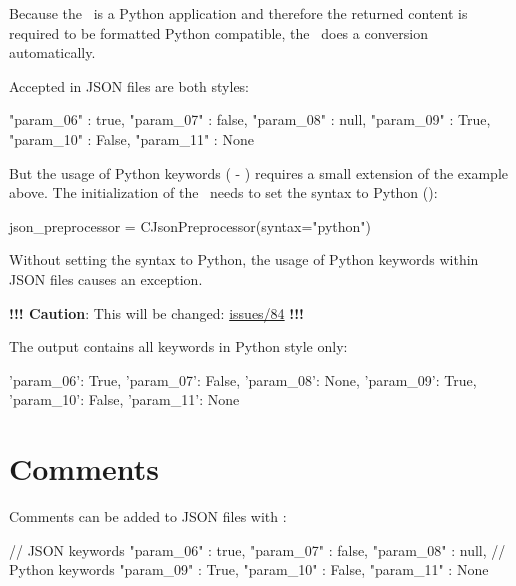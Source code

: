 Because the \pkg\ is a Python application and therefore the returned content is required to be formatted Python compatible,
the \pkg\ does a conversion automatically.

Accepted in JSON files are both styles:

\begin{pythoncode}
{
   "param_06" : true,
   "param_07" : false,
   "param_08" : null,
   "param_09" : True,
   "param_10" : False,
   "param_11" : None
}
\end{pythoncode}

But the usage of Python keywords ( - ) requires a small extension of the example above.
The initialization of the \pkg\ needs to set the syntax to Python ():

\begin{pythoncode}
json_preprocessor = CJsonPreprocessor(syntax="python")
\end{pythoncode}

Without setting the syntax to Python, the usage of Python keywords within JSON files causes an exception.

\textbf{!!! Caution}: This will be changed:
\href{https://github.com/test-fullautomation/python-jsonpreprocessor/issues/84}{issues/84} \textbf{!!!}

The output contains all keywords in Python style only:

\begin{pythonlog}
{'param_06': True,
 'param_07': False,
 'param_08': None,
 'param_09': True,
 'param_10': False,
 'param_11': None}
\end{pythonlog}


\newpage

\section{Comments}

Comments can be added to JSON files with \pcode{//}:

\begin{pythoncode}
{
   // JSON keywords
   "param_06" : true,
   "param_07" : false,
   "param_08" : null,
   // Python keywords
   "param_09" : True,
   "param_10" : False,
   "param_11" : None
}
\end{pythoncode}

